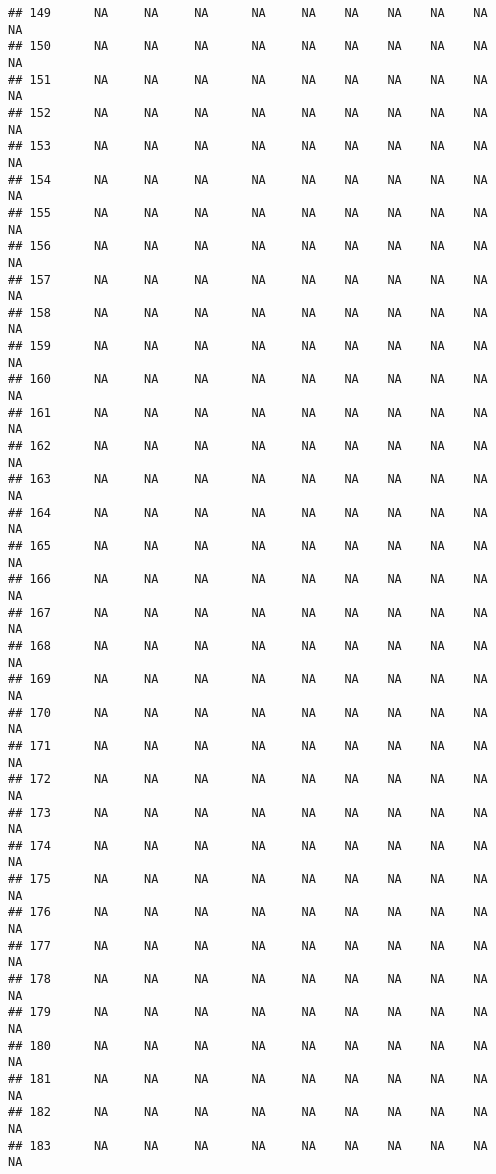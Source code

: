\documentclass{article}\usepackage{graphicx, color}
\makeatletter
\newenvironment{kframe}{%
 \def\at@end@of@kframe{}%
 \ifinner\ifhmode%
  \def\at@end@of@kframe{\end{minipage}}%
  \begin{minipage}{\columnwidth}%
 \fi\fi%
 \def\FrameCommand##1{\hskip\@totalleftmargin \hskip-\fboxsep
 \colorbox{shadecolor}{##1}\hskip-\fboxsep
     \hskip-\linewidth \hskip-\@totalleftmargin \hskip\columnwidth}%
 \MakeFramed {\advance\hsize-\width
   \@totalleftmargin\z@ \linewidth\hsize
   \@setminipage}}%
 {\par\unskip\endMakeFramed%
 \at@end@of@kframe}
\newenvironment{knitrout}{}{} %
\makeatother
\begin{document}
\begin{knitrout}
\begin{kframe}
\begin{verbatim}
## 149      NA     NA     NA      NA     NA    NA    NA    NA    NA     NA
## 150      NA     NA     NA      NA     NA    NA    NA    NA    NA     NA
## 151      NA     NA     NA      NA     NA    NA    NA    NA    NA     NA
## 152      NA     NA     NA      NA     NA    NA    NA    NA    NA     NA
## 153      NA     NA     NA      NA     NA    NA    NA    NA    NA     NA
## 154      NA     NA     NA      NA     NA    NA    NA    NA    NA     NA
## 155      NA     NA     NA      NA     NA    NA    NA    NA    NA     NA
## 156      NA     NA     NA      NA     NA    NA    NA    NA    NA     NA
## 157      NA     NA     NA      NA     NA    NA    NA    NA    NA     NA
## 158      NA     NA     NA      NA     NA    NA    NA    NA    NA     NA
## 159      NA     NA     NA      NA     NA    NA    NA    NA    NA     NA
## 160      NA     NA     NA      NA     NA    NA    NA    NA    NA     NA
## 161      NA     NA     NA      NA     NA    NA    NA    NA    NA     NA
## 162      NA     NA     NA      NA     NA    NA    NA    NA    NA     NA
## 163      NA     NA     NA      NA     NA    NA    NA    NA    NA     NA
## 164      NA     NA     NA      NA     NA    NA    NA    NA    NA     NA
## 165      NA     NA     NA      NA     NA    NA    NA    NA    NA     NA
## 166      NA     NA     NA      NA     NA    NA    NA    NA    NA     NA
## 167      NA     NA     NA      NA     NA    NA    NA    NA    NA     NA
## 168      NA     NA     NA      NA     NA    NA    NA    NA    NA     NA
## 169      NA     NA     NA      NA     NA    NA    NA    NA    NA     NA
## 170      NA     NA     NA      NA     NA    NA    NA    NA    NA     NA
## 171      NA     NA     NA      NA     NA    NA    NA    NA    NA     NA
## 172      NA     NA     NA      NA     NA    NA    NA    NA    NA     NA
## 173      NA     NA     NA      NA     NA    NA    NA    NA    NA     NA
## 174      NA     NA     NA      NA     NA    NA    NA    NA    NA     NA
## 175      NA     NA     NA      NA     NA    NA    NA    NA    NA     NA
## 176      NA     NA     NA      NA     NA    NA    NA    NA    NA     NA
## 177      NA     NA     NA      NA     NA    NA    NA    NA    NA     NA
## 178      NA     NA     NA      NA     NA    NA    NA    NA    NA     NA
## 179      NA     NA     NA      NA     NA    NA    NA    NA    NA     NA
## 180      NA     NA     NA      NA     NA    NA    NA    NA    NA     NA
## 181      NA     NA     NA      NA     NA    NA    NA    NA    NA     NA
## 182      NA     NA     NA      NA     NA    NA    NA    NA    NA     NA
## 183      NA     NA     NA      NA     NA    NA    NA    NA    NA     NA

\end{verbatim}
\end{kframe}
\end{knitrout}
\end{document}
